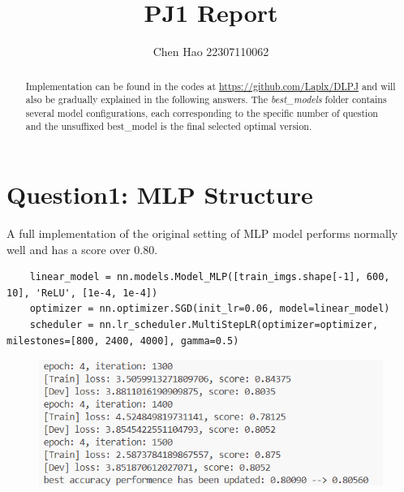 \documentclass[]{article}
\title{PJ1 Report}
\author{Chen Hao 22307110062}
\begin{document}
\maketitle

\begin{abstract}
Implementation can be found in the codes at \url{https://github.com/Laplx/DLPJ} and will also be gradually explained in the following answers. The \textit{best\_models} folder contains several model configurations, each corresponding to the specific number of question and the unsuffixed best\_model is the final selected optimal version.
\end{abstract}

\section{Question1: MLP Structure}

A full implementation of the original setting of MLP model performs normally well and has a score over 0.80.
\begin{lstlisting}
	linear_model = nn.models.Model_MLP([train_imgs.shape[-1], 600, 10], 'ReLU', [1e-4, 1e-4])
	optimizer = nn.optimizer.SGD(init_lr=0.06, model=linear_model)
	scheduler = nn.lr_scheduler.MultiStepLR(optimizer=optimizer, milestones=[800, 2400, 4000], gamma=0.5)
\end{lstlisting}

\begin{figure}
	\centering
	\includegraphics[width=0.7\linewidth]{Q1}
	\caption{}
	\label{fig:q1}
\end{figure}
\end{document}
